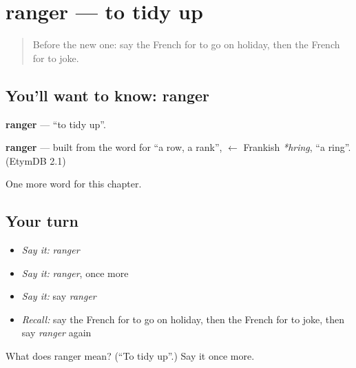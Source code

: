 \section[ranger]{ranger — to tidy up}

\label{lesson:FR-C242-ranger}



\begin{quote}
Before the new one: say the French for to go on holiday, then the French for to joke.
\end{quote}

\subsection*{You'll want to know: ranger}
\textbf{ranger} — \textquotedblleft{}to tidy up\textquotedblright{}.

\begin{cousinweb}
\textbf{ranger} — built from the word for \textquotedblleft{}a row, a rank\textquotedblright{}, $\leftarrow$ Frankish \emph{*hring}, \textquotedblleft{}a ring\textquotedblright{}. (EtymDB 2.1)
\end{cousinweb}

\begin{grammarlens}[title={What you've built}]
One more word for this chapter.
\end{grammarlens}

\subsection*{Your turn}
\begin{itemize}
\raggedright
  \item \emph{Say it:} \emph{ranger}
  \item \emph{Say it:} \emph{ranger}, once more
  \item \emph{Say it:} say \emph{ranger}
  \item \emph{Recall:} say the French for to go on holiday, then the French for to joke, then say \emph{ranger} again
\end{itemize}

\begin{tcolorbox}[breakable,colback=teal!4,colframe=teal!35!black,title={Before you move on}]
What does ranger mean? (\textquotedblleft{}To tidy up\textquotedblright{}.) Say it once more.
\end{tcolorbox}
